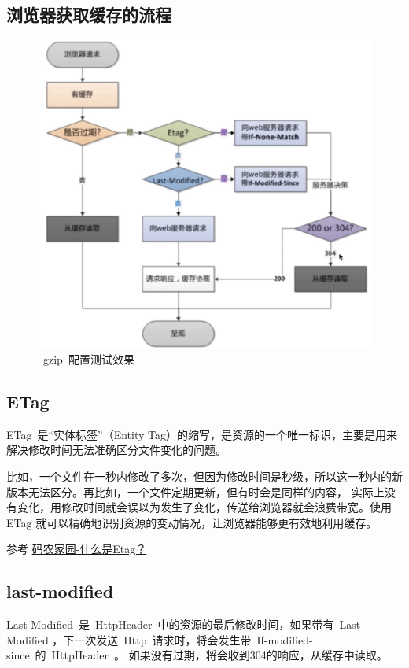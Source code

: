 \documentclass[12pt, a4paper]{article} %
\renewcommand{\figurename}{图} %
\begin{document}
\begin{CJK*}{UTF8}{gbsn}
\subsection{浏览器获取缓存的流程}
\renewcommand{\figurename}{图} %
\begin{figure}[htbp]
    \centering
    \includegraphics[width=1\textwidth]{./imgs/catch2023-08-23-18.30.26.png}
    \caption{~gzip~配置测试效果}
\end{figure}

\clearpage
\subsection{ETag}
ETag~是“实体标签”（Entity Tag）的缩写，是资源的一个唯一标识，主要是用来解决修改时间无法准确区分文件变化的问题。

比如，一个文件在一秒内修改了多次，但因为修改时间是秒级，所以这一秒内的新版本无法区分。再比如，一个文件定期更新，但有时会是同样的内容，
实际上没有变化，用修改时间就会误以为发生了变化，传送给浏览器就会浪费带宽。使用 ETag 就可以精确地识别资源的变动情况，让浏览器能够更有效地利用缓存。

参考 \href{https://www.codenong.com/cs105674287/}{码农家园-什么是Etag？}

\subsection{last-modified}
Last-Modified~是~HttpHeader~中的资源的最后修改时间，如果带有~Last-Modified ，下一次发送~Http~请求时，将会发生带~If-modified-since~的~HttpHeader~。
如果没有过期，将会收到304的响应，从缓存中读取。


\end{CJK*}
\end{document}
